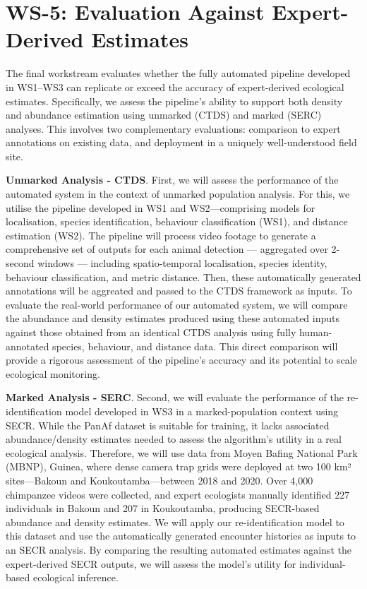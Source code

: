 \section*{WS-5: Evaluation Against Expert-Derived Estimates}

The final workstream evaluates whether the fully automated pipeline developed in WS1–WS3 can replicate or exceed the accuracy of expert-derived ecological estimates. Specifically, we assess the pipeline’s ability to support both density and abundance estimation using unmarked (CTDS) and marked (SERC) analyses. This involves two complementary evaluations: comparison to expert annotations on existing data, and deployment in a uniquely well-understood field site.

\textbf{Unmarked Analysis - CTDS}. First, we will assess the performance of the automated system in the context of unmarked population analysis. For this, we utilise the pipeline developed in WS1 and WS2—comprising models for localisation, species identification, behaviour classification (WS1), and distance estimation (WS2). The pipeline will process video footage to generate a comprehensive set of outputs for each animal detection — aggregated over 2-second windows — including spatio-temporal localisation, species identity, behaviour classification, and metric distance. Then, these automatically generated annotations will be aggreated and passed to the CTDS framework as inputs. To evaluate the real-world performance of our automated system, we will compare the abundance and density estimates produced using these automated inputs against those obtained from an identical CTDS analysis using fully human-annotated species, behaviour, and distance data. This direct comparison will provide a rigorous assessment of the pipeline’s accuracy and its potential to scale ecological monitoring.

\textbf{Marked Analysis - SERC}. Second, we will evaluate the performance of the re-identification model developed in WS3 in a marked-population context using SECR. While the PanAf dataset is suitable for training, it lacks associated abundance/density estimates needed to assess the algorithm’s utility in a real ecological analysis. Therefore, we will use data from Moyen Bafing National Park (MBNP), Guinea, where dense camera trap grids were deployed at two 100 km² sites—Bakoun and Koukoutamba—between 2018 and 2020. Over 4,000 chimpanzee videos were collected, and expert ecologists manually identified 227 individuals in Bakoun and 207 in Koukoutamba, producing SECR-based abundance and density estimates. We will apply our re-identification model to this dataset and use the automatically generated encounter histories as inputs to an SECR analysis. By comparing the resulting automated estimates against the expert-derived SECR outputs, we will assess the model’s utility for individual-based ecological inference.

